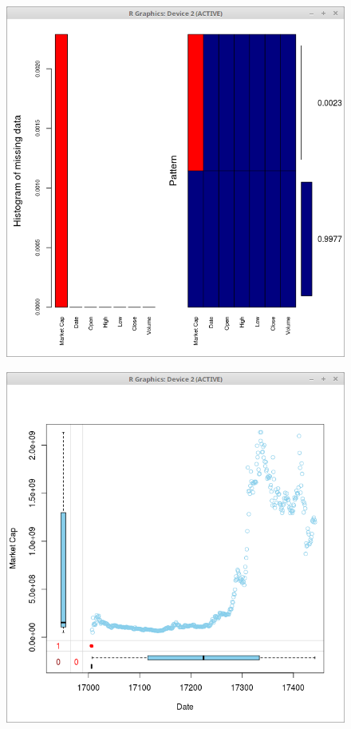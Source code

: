 \documentclass{article}
\begin{document}
\begin{figure}
\centering
\begin{minipage}{.5\textwidth}
  \centering
  \includegraphics[width=.8\linewidth]{ethereum_classic_price_missing}
  \label{fig:test1}
\end{minipage}%
\begin{minipage}{.5\textwidth}
  \centering
  \includegraphics[width=.8\linewidth]{eth_classic_price_missing}
  \label{fig:test2}
\end{minipage}
\end{figure}
\end{document}
